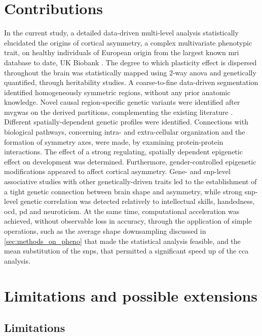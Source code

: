 \section{Contributions}
In the current study, a detailed  data-driven multi-level analysis statistically elucidated the origins of cortical asymmetry, a complex multivariate phenotypic trait, on healthy individuals of European origin from the largest known \ac{mri} database to date, UK Biobank \cite{Littlejohns2020}. The degree to which plasticity effect is dispersed throughout the brain was statistically mapped using 2-way \ac{anova} and genetically quantified, through heritability studies. A coarse-to-fine data-driven segmentation identified homogeneously symmetric regions, without any prior anatomic knowledge.  Novel causal region-specific genetic variants were identified after \ac{mvgwas} on the derived partitions, complementing the existing literature \cite{Sha2021}. Different spatially-dependent genetic profiles were identified. Connections with biological pathways, concerning intra- and extra-cellular organization and the formation of symmetry axes, were made, by examining protein-protein interactions. The effect of a strong regulating, spatially dependent epigenetic effect on development was determined. Furthermore, gender-controlled epigenetic modifications appeared to affect cortical asymmetry. Gene- and \ac{snp}-level associative studies  with other genetically-driven traits led to the establishment of a tight genetic connection between  brain shape and asymmetry, while strong \ac{snp}-level genetic correlation was detected relatively to intellectual skills, handedness, \ac{ocd}, \ac{pd} and neuroticism. At the same time, computational acceleration was achieved, without observable loss in accuracy, through the application of simple operations, such as the average shape downsampling discussed in \autoref{sec:methods_on_pheno} that made the statistical analysis feasible, and the mean substitution of the \acp{snp}, that permitted a significant speed up of the \ac{cca} analysis.

\section{Limitations and possible extensions}
\subsection{Limitations}

